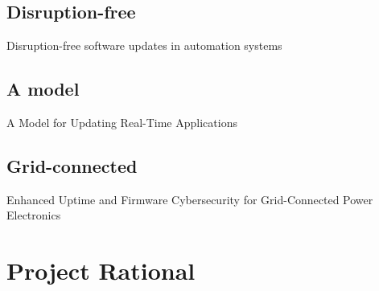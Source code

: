\subsection{Disruption-free}
Disruption-free software updates in automation systems

\subsection{A model}
A Model for Updating Real-Time Applications

\subsection{Grid-connected}
Enhanced Uptime and Firmware Cybersecurity for Grid-Connected Power Electronics

\newpage

\section{Project Rational}